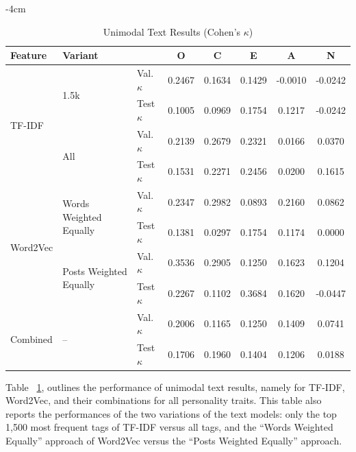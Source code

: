\begin{table}[h]
	\centering
    \addtolength{\leftskip} {-4cm}
    \addtolength{\rightskip}{-4cm}
	\caption{Unimodal Text Results (Cohen's $\kappa$)}
	\label{tab:unimodal_text_performance}
	\begin{tabular}{lllccccc}
        \hline
        \textbf{Feature} & \multicolumn{2}{l}{\textbf{Variant}} & \textbf{O} & \textbf{C} & \textbf{E} & \textbf{A} & \textbf{N} \\
        \hline
        \multirow{4}{*}{TF-IDF} %
        & \multirow{2}{*}{1.5k} & Val. $\kappa$ & 0.2467 & 0.1634 & 0.1429 & -0.0010 & -0.0242 \\  
        &                       & Test $\kappa$ & 0.1005 & 0.0969 & 0.1754 & 0.1217 & -0.0242 \\ \cline{2-8} 
        & \multirow{2}{*}{All}  & Val. $\kappa$ & 0.2139 & 0.2679 & 0.2321 & 0.0166 & 0.0370 \\   
        &                       & Test $\kappa$ & 0.1531 & 0.2271 & 0.2456 & 0.0200 & 0.1615 \\   
        \hline
        \multirow{4}{*}{Word2Vec} %
        & \multirow{2}{*}{Words Weighted Equally} & Val. $\kappa$ & 0.2347 & 0.2982 & 0.0893 & 0.2160 & 0.0862 \\
        &                                         & Test $\kappa$ & 0.1381 & 0.0297 & 0.1754 & 0.1174 & 0.0000 \\ \cline{2-8}
        & \multirow{2}{*}{Posts Weighted Equally} & Val. $\kappa$ & 0.3536 & 0.2905 & 0.1250 & 0.1623 & 0.1204 \\
        &                                         & Test $\kappa$ & 0.2267 & 0.1102 & 0.3684 & 0.1620 & -0.0447 \\ 
        \hline
        \multirow{2}{*}{Combined} 
        & \multirow{2}{*}{--} & Val. $\kappa$ & 0.2006 & 0.1165 & 0.1250 & 0.1409 & 0.0741 \\
        &                     & Test $\kappa$ & 0.1706 & 0.1960 & 0.1404 & 0.1206 & 0.0188 \\
        \hline
	\end{tabular}
\end{table}

Table ~\ref{tab:unimodal_text_performance}, outlines the performance of unimodal text results, namely for TF-IDF, Word2Vec, and their combinations for all personality traits. This table also reports the performances of the two variations of the text models: only the top 1,500 most frequent tags of TF-IDF versus all tags, and the “Words Weighted Equally” approach of Word2Vec versus the “Posts Weighted Equally” approach.

